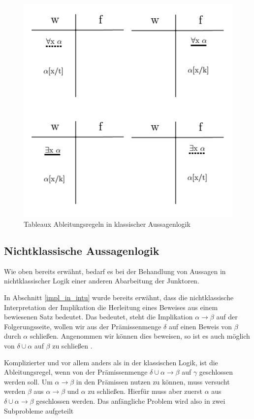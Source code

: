 \begin{figure}[h]
\begin{center}
\includegraphics[scale=0.7]{images/Tableaux_Rules_Pred_Logic.png}
\caption{Tableaux Ableitungsregeln in klassischer Aussagenlogik}
\label{tableaux_class_pred_all_rules}
\end{center}
\end{figure}

\subsection{\label{tableaux_impl_descr}Nichtklassische Aussagenlogik}
Wie oben bereits erwähnt, bedarf es bei der Behandlung von Aussagen in nichtklassischer Logik einer anderen Abarbeitung der Junktoren.

In Abschnitt \ref{impl_in_intu} wurde bereits erwähnt, dass die nichtklassische Interpretation der Implikation die Herleitung eines Beweises aus einem bewiesenen Satz bedeutet. Das bedeutet, steht die Implikation $\alpha\rightarrow\beta$ auf der Folgerungsseite, wollen wir aus der Prämissenmenge $\delta$ auf einen Beweis von $\beta$ durch $\alpha$ schließen. Angenommen wir können dies beweisen, so ist es auch möglich von $\delta\cup\alpha$ auf $\beta$ zu schließen \cite{B62}.

Komplizierter und vor allem anders als in der klassischen Logik, ist die Ableitungsregel, wenn von der Prämissenmenge $\delta\cup\alpha\rightarrow\beta$ auf $\gamma$ geschlossen werden soll. Um $\alpha\rightarrow\beta$ in den Prämissen nutzen zu können, muss versucht werden $\beta$ aus $\alpha\rightarrow\beta$ und $\alpha$ zu schließen. Hierfür muss aber zuerst $\alpha$ aus $\delta\cup\alpha\rightarrow\beta$ geschlossen werden. Das anfängliche Problem wird also in zwei Subprobleme aufgeteilt \cite{B62}

